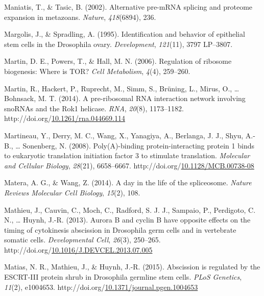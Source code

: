 \documentclass[12pt,oneside]{reedthesis}
\newlength{\cslhangindent}
\newenvironment{CSLReferences}[2] %
 {%
  \setlength{\parindent}{0pt}
  \ifodd #1 \everypar{\setlength{\hangindent}{\cslhangindent}}\ignorespaces\fi
  \ifnum #2 > 0
  \setlength{\parskip}{#2\baselineskip}
  \fi
 }%
 {}
\begin{document}
\begin{CSLReferences}{1}{0}
\leavevmode{}%
Maniatis, T., \& Tasic, B. (2002). Alternative pre-{mRNA} splicing and proteome expansion in metazoans. \emph{Nature}, \emph{418}(6894), 236.

\leavevmode{}%
Margolis, J., \& Spradling, A. (1995). Identification and behavior of epithelial stem cells in the {Drosophila} ovary. \emph{Development}, \emph{121}(11), 3797 LP--3807.

\leavevmode{}%
Martin, D. E., Powers, T., \& Hall, M. N. (2006). Regulation of ribosome biogenesis: Where is {TOR}? \emph{Cell Metabolism}, \emph{4}(4), 259--260.

\leavevmode{}%
Martin, R., Hackert, P., Ruprecht, M., Simm, S., Brüning, L., Mirus, O., \ldots{} Bohnsack, M. T. (2014). A pre-ribosomal {RNA} interaction network involving {snoRNAs} and the {Rok1} helicase. \emph{RNA}, \emph{20}(8), 1173--1182. http://doi.org/\href{https://doi.org/10.1261/rna.044669.114}{10.1261/rna.044669.114}

\leavevmode{}%
Martineau, Y., Derry, M. C., Wang, X., Yanagiya, A., Berlanga, J. J., Shyu, A.-B., \ldots{} Sonenberg, N. (2008). Poly({A})-binding protein-interacting protein 1 binds to eukaryotic translation initiation factor 3 to stimulate translation. \emph{Molecular and Cellular Biology}, \emph{28}(21), 6658--6667. http://doi.org/\href{https://doi.org/10.1128/MCB.00738-08}{10.1128/MCB.00738-08}

\leavevmode{}%
Matera, A. G., \& Wang, Z. (2014). A day in the life of the spliceosome. \emph{Nature Reviews Molecular Cell Biology}, \emph{15}(2), 108.

\leavevmode{}%
Mathieu, J., Cauvin, C., Moch, C., Radford, S. J. J., Sampaio, P., Perdigoto, C. N., \ldots{} Huynh, J.-R. (2013). Aurora {B} and cyclin {B} have opposite effects on the timing of cytokinesis abscission in {Drosophila} germ cells and in vertebrate somatic cells. \emph{Developmental Cell}, \emph{26}(3), 250--265. http://doi.org/\href{https://doi.org/10.1016/J.DEVCEL.2013.07.005}{10.1016/J.DEVCEL.2013.07.005}

\leavevmode{}%
Matias, N. R., Mathieu, J., \& Huynh, J.-R. (2015). Abscission is regulated by the {ESCRT}-{III} protein shrub in {Drosophila} germline stem cells. \emph{PLoS Genetics}, \emph{11}(2), e1004653. http://doi.org/\href{https://doi.org/10.1371/journal.pgen.1004653}{10.1371/journal.pgen.1004653}


\end{CSLReferences}
\end{document}
